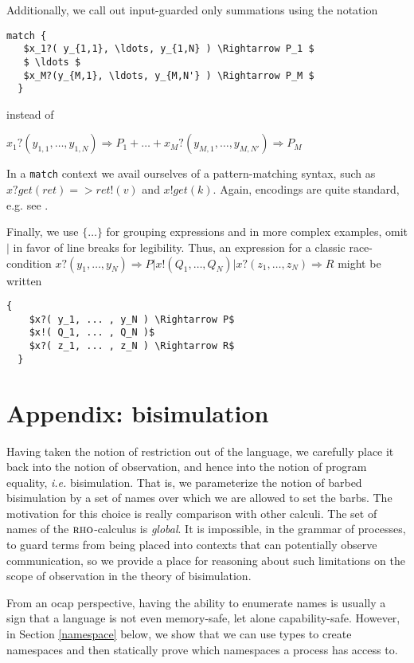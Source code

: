 \documentclass[]{acm_proc_article-sp}
\newcommand{\id}[1]{\texttt{#1}}
\newcommand{\juxtap}{\mathbin{\id{|}}}
\newcommand{\binpar}[2]{#1 \juxtap #2}
\numberwithin{equation}{subsection}
\newcommand{\rhoc}{${\textsc{rho}}$-calculus}
\begin{document}
Additionally, we call out input-guarded only summations using the notation

\begin{lstlisting}[mathescape]
  match { 
   $x_1?( y_{1,1}, \ldots, y_{1,N} ) \Rightarrow P_1 $
   $ \ldots $
   $x_M?(y_{M,1}, \ldots, y_{M,N'} ) \Rightarrow P_M $ 
  }
\end{lstlisting}

\noindent instead of 

$x_1?( y_{1,1}, \ldots, y_{1,N} ) \Rightarrow P_1 + \ldots + x_M?( y_{M,1},\ldots, y_{M,N'} ) \Rightarrow P_M$

In a \texttt{match} context we avail ourselves of a pattern-matching
syntax, such as $x ? get( ret ) => ret!( v )$ and $x ! get( k
)$. Again, encodings are quite standard, e.g. see
\cite{Brown05piduce:a}.

Finally, we use $\{ \ldots \}$ for grouping expressions and in more complex examples, omit
$\binpar{}{}$ in favor of line breaks for legibility. Thus, an expression for a classic race-condition $\binpar{ x?( y_1, \ldots, y_N ) \Rightarrow P}{\binpar{x!( Q_1, \ldots, Q_N )}{ x?( z_1, \ldots, z_N ) \Rightarrow R}}$ might be written
\begin{lstlisting}[mathescape]
  {
    $x?( y_1, ... , y_N ) \Rightarrow P$
    $x!( Q_1, ... , Q_N )$
    $x?( z_1, ... , z_N ) \Rightarrow R$
  }
\end{lstlisting}

\section{Appendix: bisimulation}

Having taken the notion of restriction out of the language, we
carefully place it back into the notion of observation, and hence into
the notion of program equality, {\em i.e.} bisimulation. That is, we
parameterize the notion of barbed bisimulation by a set of names over
which we are allowed to set the barbs. The motivation for this choice
is really comparison with other calculi. The set of names of the
{\rhoc} is \textit{global}. It is impossible, in the grammar of
processes, to guard terms from being placed into contexts that can
potentially observe communication, so we provide a place for
reasoning about such limitations on the scope of observation in the
theory of bisimulation.

From an ocap perspective, having the ability to enumerate names is
usually a sign that a language is not even memory-safe, let alone
capability-safe.  However, in Section \ref{namespace} below, we show
that we can use types to create namespaces and then statically prove
which namespaces a process has access to.
\end{document}
